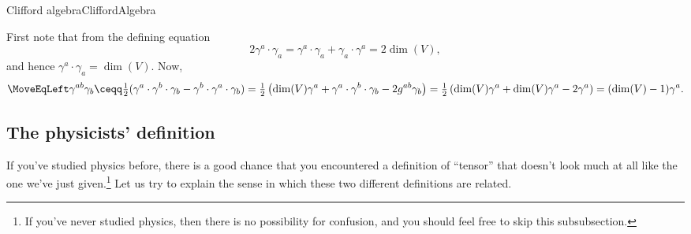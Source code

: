 \begin{exr}{Clifford algebra}{CliffordAlgebra}
	\begin{solution}
		First note that from the defining equation
		\begin{equation}
		2\gamma ^a\cdot \gamma _a=\gamma ^a\cdot \gamma _a+\gamma _a\cdot \gamma ^a=2\dim (V),
		\end{equation}
		and hence $\gamma ^a\cdot \gamma _a=\dim (V)$.  Now,
		\begin{equation}
		\begin{split}
		\MoveEqLeft
		\gamma ^{ab}\gamma _b\ceqq \tfrac{1}{2}(\gamma ^a\cdot \gamma ^b\cdot \gamma _b-\gamma ^b\cdot \gamma ^a\cdot \gamma _b)=\tfrac{1}{2}\left( \dim (V)\gamma ^a+\gamma ^a\cdot \gamma ^b\cdot \gamma _b-2g^{ab}\gamma _b\right) =\tfrac{1}{2}\left( \dim (V)\gamma ^a+\dim (V)\gamma ^a-2\gamma ^a\right) =(\dim (V)-1)\gamma ^a.
		\end{split}
		\end{equation}
	\end{solution}
\end{exr}

\subsection{The physicists' definition}\label{sbsThePhysicistsDefinition}

If you've studied physics before, there is a good chance that you encountered a definition of ``tensor'' that doesn't look much at all like the one we've just given.\footnote{If you've never studied physics, then there is no possibility for confusion, and you should feel free to skip this subsubsection.}  Let us try to explain the sense in which these two different definitions are related.

